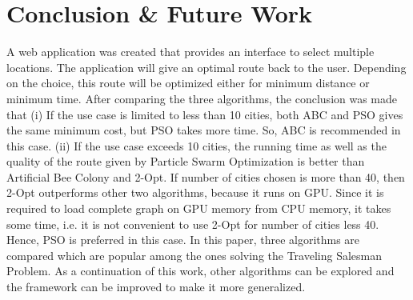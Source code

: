\documentclass[conference]{IEEEtran}
\begin{document}
\section {Conclusion \& Future Work}
A web application was created that provides an interface to select multiple locations. The application will give an optimal route back to the user. Depending on the choice, this route will be optimized either for minimum distance or minimum time. After comparing the three algorithms, the conclusion was made that (i) If the use case is limited to less than 10 cities, both ABC and PSO gives the same minimum cost, but PSO takes more time. So, ABC is recommended in this case. (ii) If the use case exceeds 10 cities, the running time as well as the quality of the route given by Particle Swarm Optimization is better than Artificial Bee Colony and 2-Opt. If number of cities chosen is more than 40, then 2-Opt outperforms other two algorithms, because it runs on GPU. Since it is required to load complete graph on GPU memory from CPU memory, it takes some time, i.e. it is not convenient to use 2-Opt for number of cities less 40. Hence, PSO is preferred in this case. In this paper, three algorithms are compared which are popular among the ones solving the Traveling Salesman Problem. As a continuation of this work, other algorithms can be explored and the framework can be improved to make it more generalized.
\end{document}

